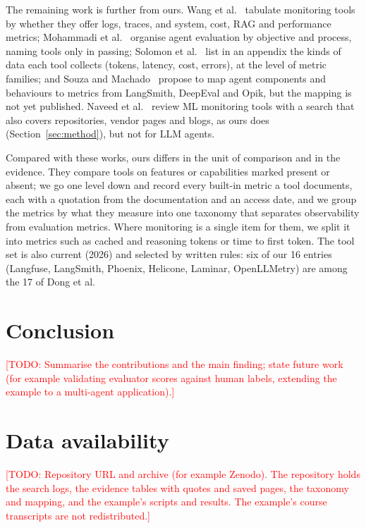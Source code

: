 \documentclass[conference]{IEEEtran}
\newcommand{\todo}[1]{\textcolor{red}{[TODO: #1]}}
\begin{document}
The remaining work is further from ours. Wang et al.~\cite{wang2025agentops} tabulate monitoring tools by whether they offer logs, traces, and system, cost, RAG and performance metrics; Mohammadi et al.~\cite{mohammadi2025evaluation} organise agent evaluation by objective and process, naming tools only in passing; Solomon et al.~\cite{solomon2025lumimas} list in an appendix the kinds of data each tool collects (tokens, latency, cost, errors), at the level of metric families; and Souza and Machado~\cite{souza2026architecture} propose to map agent components and behaviours to metrics from LangSmith, DeepEval and Opik, but the mapping is not yet published. Naveed et al.~\cite{naveed2025monitoring} review ML monitoring tools with a search that also covers repositories, vendor pages and blogs, as ours does (Section~\ref{sec:method}), but not for LLM agents.

Compared with these works, ours differs in the unit of comparison and in the evidence. They compare tools on features or capabilities marked present or absent; we go one level down and record every built-in metric a tool documents, each with a quotation from the documentation and an access date, and we group the metrics by what they measure into one taxonomy that separates observability from evaluation metrics. Where monitoring is a single item for them, we split it into metrics such as cached and reasoning tokens or time to first token. The tool set is also current (2026) and selected by written rules: six of our 16 entries (Langfuse, LangSmith, Phoenix, Helicone, Laminar, OpenLLMetry) are among the 17 of Dong et al.

\section{Conclusion}
\todo{Summarise the contributions and the main finding; state future work (for example validating evaluator scores against human labels, extending the example to a multi-agent application).}

\section*{Data availability}
\todo{Repository URL and archive (for example Zenodo). The repository holds the search logs, the evidence tables with quotes and saved pages, the taxonomy and mapping, and the example's scripts and results. The example's course transcripts are not redistributed.}



\end{document}
